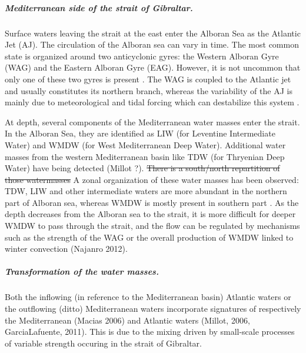 \color{blue}\subparagraph{Mediterranean side of the strait of Gibraltar.} \color{black}

Surface waters leaving the strait at the east enter the Alboran Sea as the Atlantic Jet (AJ). The circulation of the Alboran sea \color{blue}can vary in time\color{blue}. The most common state is organized around two anticyclonic gyres: \color{blue}the Western Alboran Gyre (WAG) and the Eastern Alboran Gyre (EAG)\color{black}. \color{blue}However, it is \color{black} not uncommon that only one of \color{blue}these two gyres \color{blue} is present \citep{millot_2005}. The WAG is coupled to the Atlantic jet \color{blue}and \color{black} usually constitutes its northern branch, \color{blue}whereas the \color{black} variability of the AJ is mainly due to meteorological and tidal forcing which can destabilize this system \citep{sanchez-garrido_2013,lorente_2019}.

At depth, several \color{blue}components of \color{black} the Mediterranean water masses enter the strait. In the Alboran Sea, \color{blue}they are \color{black}identified as LIW (for Leventine Intermediate Water) and WMDW (for West Mediterranean Deep Water). \color{blue} Additional water masses from the western Mediterranean basin \color{blue} like TDW (for Thryenian Deep Water) \color{blue}have \color{black} being detected \color{blue}(Millot ?)\color{black}. \sout{There is a south/north repartition of those watermasses} A zonal organization of these water masses has been observed: TDW, LIW and other intermediate waters are \color{black} more abundant in the northern part of Alboran sea, whereas WMDW  \color{blue}is mostly present \color{black} in southern part \citep{millot_2014}. As the depth decreases from the Alboran sea to the strait, it is more difficult for deeper WMDW to \color{blue}pass through the \color{black} strait, and the flow can be regulated by mechanisms such as the strength of the WAG or the overall production of WMDW linked to winter convection (Najanro 2012).

\color{blue}\subparagraph{Transformation of the water masses.} \color{black}
\color{blue}Both the inflowing (in reference to the Mediterranean basin) Atlantic waters or the outflowing (ditto) Mediterranean waters incorporate \color{black} signatures of respectively the Mediterranean (Macias 2006) and Atlantic waters (Millot, 2006, GarciaLafuente, 2011). This is due to the mixing driven by small-scale processes of variable strength \color{blue}occuring in the strait of Gibraltar. \color{black} 


